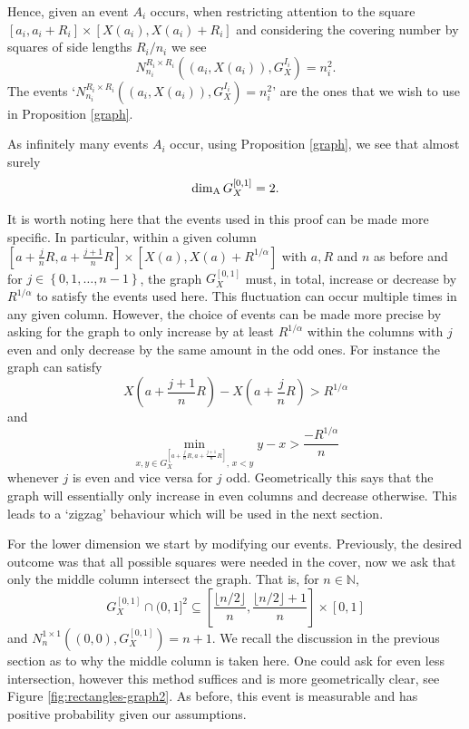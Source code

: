 Hence, given an event $A_i$ occurs, when restricting attention to the square $[a_i, a_i + R_i] \times [X(a_i), X(a_i)+R_i]$ and considering the covering number by squares of side lengths $R_i/n_i$ we see
\[
N_{n_i}^{R_i \times R_i }\left((a_i,X(a_i)),G_{X}^{I_i}\right)=n_i^2.
\]
The events `$N_{n_i}^{R_i \times R_i }\left((a_i,X(a_i)),G_{X}^{I_i}\right)=n_i^2$' are the ones that we wish to use in Proposition \ref{graph}.

As infinitely many events $A_i$ occur, using Proposition \ref{graph}, we see that almost surely
\[
\dim_{\textup{A}} G_{X}^{[0,1]}=2.
\]

It is worth noting here that the events used in this proof can be made more specific. In particular, within a given column $[a + \frac{j}{n}R, a + \frac{j+1}{n}R] \times [X(a), X(a)+R^{1/\alpha}]$ with $a, R$ and $n$ as before and for $j \in \left\{0,1,\ldots, n-1 \right\}$, the graph $G_X^{[0,1]}$ must, in total, increase or decrease by $R^{1/\alpha}$ to satisfy the events used here. This fluctuation can occur multiple times in any given column. However, the choice of events can be made more precise by asking for the graph to only increase by at least $R^{1/\alpha}$ within the columns with $j$ even and only decrease by the same amount in the odd ones. For instance the graph can satisfy 
\[X(a + \frac{j+1}{n}R) -X(a + \frac{j}{n}R) > R^{1/\alpha}\] 
and 
\[\min_{x,y\in G_X^{[a+\frac{j}{n}R, a + \frac{j+1}{n}R]},\, x < y} y - x > \frac{-R^{1/\alpha }}{n} \]
whenever $j$ is even and vice versa for $j$ odd. Geometrically this says that the graph will essentially only increase in even columns and decrease otherwise. This leads to a `zigzag' behaviour which will be used in the next section.


For the lower dimension we start by modifying our events. Previously, the desired outcome was that all possible squares were needed in the cover, now we ask that only the middle column intersect the graph. That is, for $n\in \mathbb{N}$,
$$G_{X}^{[0,1]} \cap (0,1]^2 \subseteq \left[\frac{\lfloor n/2 \rfloor}{n} ,  \frac{\lfloor n/2 \rfloor + 1}{n} \right] \times [0,1]$$
and $N_{n}^{1\times 1}((0,0),G_X^{[0,1]}) = n + 1$. We recall the discussion in the previous section as to why the middle column is taken here. One could ask for even less intersection, however this method suffices and is more geometrically clear, see Figure \ref{fig:rectangles-graph2}. As before, this event is measurable and has positive probability given our assumptions.

